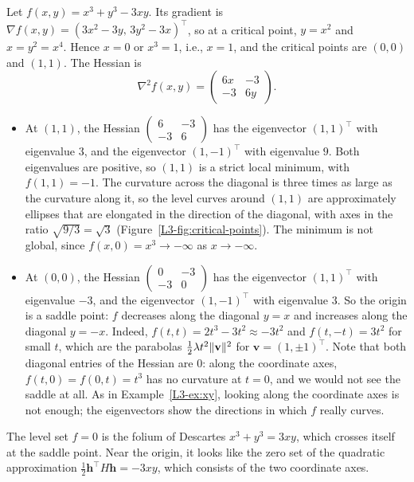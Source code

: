 \begin{example}\label{L3-ex:critical-points}
    Let $f(x, y) = x^3 + y^3 - 3xy$. Its gradient is $\nabla f(x, y) = (3x^2 - 3y, \, 3y^2 - 3x)^\top$, so at a critical point, $y = x^2$ and $x = y^2 = x^4$. Hence $x = 0$ or $x^3 = 1$, i.e., $x = 1$, and the critical points are $(0, 0)$ and $(1, 1)$. The Hessian is
    \[\nabla^2 f(x, y) = \begin{pmatrix} 6x & -3 \\ -3 & 6y \end{pmatrix}.\]
    \begin{itemize}
        \item At $(1, 1)$, the Hessian $\begin{pmatrix} 6 & -3 \\ -3 & 6 \end{pmatrix}$ has the eigenvector $(1, 1)^\top$ with eigenvalue $3$, and the eigenvector $(1, -1)^\top$ with eigenvalue $9$. Both eigenvalues are positive, so $(1, 1)$ is a strict local minimum, with $f(1, 1) = -1$. The curvature across the diagonal is three times as large as the curvature along it, so the level curves around $(1, 1)$ are approximately ellipses that are elongated in the direction of the diagonal, with axes in the ratio $\sqrt{9/3} = \sqrt{3}$ (Figure~\ref{L3-fig:critical-points}). The minimum is not global, since $f(x, 0) = x^3 \to -\infty$ as $x \to -\infty$.
        \item At $(0, 0)$, the Hessian $\begin{pmatrix} 0 & -3 \\ -3 & 0 \end{pmatrix}$ has the eigenvector $(1, 1)^\top$ with eigenvalue $-3$, and the eigenvector $(1, -1)^\top$ with eigenvalue $3$. So the origin is a saddle point: $f$ decreases along the diagonal $y = x$ and increases along the diagonal $y = -x$. Indeed, $f(t, t) = 2t^3 - 3t^2 \approx -3t^2$ and $f(t, -t) = 3t^2$ for small $t$, which are the parabolas $\frac{1}{2}\lambda t^2 \lVert \mathbf{v} \rVert^2$ for $\mathbf{v} = (1, \pm 1)^\top$. Note that both diagonal entries of the Hessian are $0$: along the coordinate axes, $f(t, 0) = f(0, t) = t^3$ has no curvature at $t = 0$, and we would not see the saddle at all. As in Example~\ref{L3-ex:xy}, looking along the coordinate axes is not enough; the eigenvectors show the directions in which $f$ really curves.
    \end{itemize}
    The level set $f = 0$ is the folium of Descartes $x^3 + y^3 = 3xy$, which crosses itself at the saddle point. Near the origin, it looks like the zero set of the quadratic approximation $\frac{1}{2}\mathbf{h}^\top H\mathbf{h} = -3xy$, which consists of the two coordinate axes.
\end{example}

